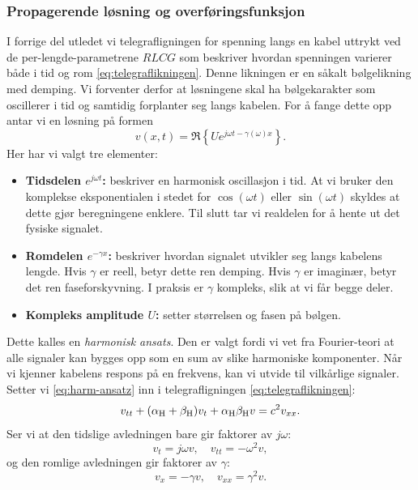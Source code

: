 \subsubsection{Propagerende løsning og overføringsfunksjon}

I forrige del utledet vi telegrafligningen for spenning langs en kabel uttrykt ved de per-lengde-parametrene $RLCG$ som beskriver hvordan spenningen varierer både i tid og rom \eqref{eq:telegraflikningen}. Denne likningen er en såkalt bølgelikning med demping. Vi forventer derfor at løsningene skal ha bølgekarakter som oscillerer i tid og samtidig forplanter seg langs kabelen. For å fange dette opp antar vi en løsning på formen \cite{HaytBuck2018}
\begin{equation}
v(x,t) = \Re\!\left\{ U e^{j\omega t - \gamma(\omega)x} \right\}.
\label{eq:harm-ansatz}
\end{equation}
Her har vi valgt tre elementer:
\begin{itemize}
    \item \textbf{Tidsdelen $e^{j\omega t}$:} beskriver en harmonisk oscillasjon i tid. At vi bruker den 
    komplekse eksponentialen i stedet for $\cos(\omega t)$ eller $\sin(\omega t)$ skyldes at dette 
    gjør beregningene enklere. Til slutt tar vi realdelen for å hente ut det fysiske signalet.\\
    \item \textbf{Romdelen $e^{-\gamma x}$:} beskriver hvordan signalet utvikler seg langs kabelens lengde. 
    Hvis $\gamma$ er reell, betyr dette ren demping. Hvis $\gamma$ er imaginær, betyr det ren faseforskyvning. 
    I praksis er $\gamma$ kompleks, slik at vi får begge deler.\\
    \item \textbf{Kompleks amplitude $U$:} setter størrelsen og fasen på bølgen.\\
\end{itemize}
Dette kalles en \emph{harmonisk ansats}. Den er valgt fordi vi vet fra Fourier-teori at alle signaler 
kan bygges opp som en sum av slike harmoniske komponenter. Når vi kjenner kabelens respons på en frekvens, 
kan vi utvide til vilkårlige signaler. Setter vi \eqref{eq:harm-ansatz} inn i telegrafligningen \eqref{eq:telegraflikningen}:
\[    
    v_{tt} + (\alpha_{\mathrm{H}} + \beta_{\mathrm{H}})v_{t} + \alpha_{\mathrm{H}} \beta_{\mathrm{H}} v = c^2 v_{xx}.
\]
Ser vi at den tidslige avledningen bare gir faktorer av $j\omega$:
\[
    v_{t} = j\omega v, \quad v_{tt} = -\omega^2 v,
\]
og den romlige avledningen gir faktorer av $\gamma$:
\[
    v_{x} = -\gamma v, \quad v_{xx} = \gamma^2 v.
\]
